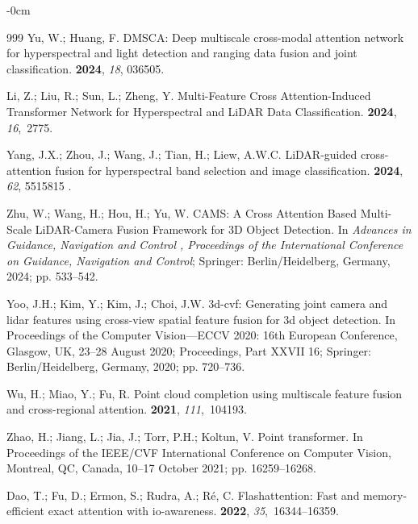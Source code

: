 \documentclass[remotesensing,article,accept,pdftex,moreauthors]{Definitions/mdpi}
\begin{document}
\begin{adjustwidth}{-\extralength}{0cm}
\begin{thebibliography}{999}
Yu, W.; Huang, F.
\newblock DMSCA: Deep multiscale cross-modal attention network for
  hyperspectral and light detection and ranging data fusion and joint
  classification.
 {\bf 2024}, {\em
  18}, 036505.

Li, Z.; Liu, R.; Sun, L.; Zheng, Y.
\newblock Multi-Feature Cross Attention-Induced Transformer Network for
  Hyperspectral and LiDAR Data Classification.
 {\bf 2024}, {\em 16},~2775.

Yang, J.X.; Zhou, J.; Wang, J.; Tian, H.; Liew, A.W.C.
\newblock LiDAR-guided cross-attention fusion for hyperspectral band selection
  and image classification.
 {\bf 2024},
  {\em 62}, 5515815
.

Zhu, W.; Wang, H.; Hou, H.; Yu, W.
\newblock CAMS: A Cross Attention Based Multi-Scale LiDAR-Camera Fusion
  Framework for 3D Object Detection.
\newblock In \emph{Advances in Guidance, Navigation and Control
, Proceedings of the International Conference on Guidance,
  Navigation and Control}; Springer: Berlin/Heidelberg, Germany, 2024; pp. 533--542.

Yoo, J.H.; Kim, Y.; Kim, J.; Choi, J.W.
\newblock 3d-cvf: Generating joint camera and lidar features using cross-view
  spatial feature fusion for 3d object detection.
\newblock In Proceedings of the Computer Vision---ECCV 2020: 16th European  Conference, Glasgow, UK, 23--28 August 2020; Proceedings, Part XXVII 16; Springer: Berlin/Heidelberg, Germany, 2020; pp. 720--736.

Wu, H.; Miao, Y.; Fu, R.
\newblock Point cloud completion using multiscale feature fusion and
  cross-regional attention.
 {\bf 2021}, {\em 111},~104193.

Zhao, H.; Jiang, L.; Jia, J.; Torr, P.H.; Koltun, V.
\newblock Point transformer.
\newblock In Proceedings of the IEEE/CVF International
  Conference on Computer Vision, Montreal, QC, Canada, 10--17 October 2021; pp. 16259--16268.

Dao, T.; Fu, D.; Ermon, S.; Rudra, A.; R{\'e}, C.
\newblock Flashattention: Fast and memory-efficient exact attention with
  io-awareness.
 {\bf 2022},
  {\em 35},~16344--16359.


\end{thebibliography}
\end{adjustwidth}
\end{document}
